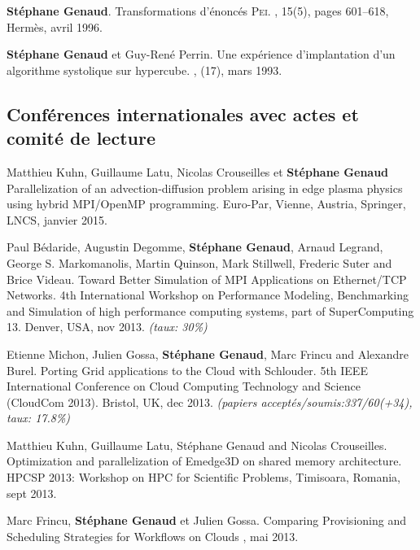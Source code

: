 \documentclass[11pt]{article}
\begin{document}
\begin{thebibliography}{99}
\textbf{Stéphane Genaud}.
\newblock Transformations d'énoncés \textsc{Pei}.
, 15(5), pages 601--618, 
Hermès, avril 1996.

\textbf{Stéphane Genaud} et Guy-René Perrin.
\newblock Une expérience d'implantation d'un algorithme systolique sur
  hypercube.
,
  (17), mars 1993.


\subsection*{Conférences internationales avec actes et comité de lecture}

Matthieu Kuhn, Guillaume Latu, Nicolas Crouseilles et \textbf{Stéphane Genaud}
\newblock Parallelization of an advection-diffusion problem arising in edge plasma physics using hybrid MPI/OpenMP programming.
\newblock Euro-Par, Vienne, Austria, Springer, LNCS, janvier 2015.

  Paul  Bédaride,  Augustin Degomme,  \textbf{Stéphane  Genaud},
  Arnaud  Legrand,  George  S.  Markomanolis, Martin  Quinson,  Mark  Stillwell,
  Frederic Suter  and Brice Videau.   
\newblock Toward Better Simulation  of MPI
  Applications on  Ethernet/TCP Networks.  
\newblock 4th  International Workshop
  on  Performance  Modeling, Benchmarking  and  Simulation  of high  performance
  computing  systems,  part  of  SuperComputing   13.  Denver,  USA,  nov  2013.
\newblock \small{\textit{(taux: 30\%)}}

Etienne Michon, Julien Gossa, \textbf{Stéphane Genaud}, Marc Frincu and Alexandre Burel.
\newblock Porting Grid applications to the Cloud with Schlouder.
\newblock 5th IEEE International Conference on Cloud Computing Technology and Science (CloudCom 2013). Bristol, UK, dec 2013.
\newblock \small{\textit{(papiers acceptés/soumis{:}337/60(+34), taux: 17.8\%)}}

Matthieu Kuhn, Guillaume Latu, Stéphane Genaud and Nicolas Crouseilles.
\newblock Optimization and parallelization of Emedge3D on shared memory architecture.
\newblock HPCSP 2013: Workshop on HPC for Scientific Problems, Timisoara, Romania, sept 2013.


Marc Frincu, \textbf{Stéphane Genaud} et Julien Gossa.
\newblock Comparing Provisioning and Scheduling Strategies for Workflows on Clouds
, mai 2013.


\end{thebibliography}
\end{document}
